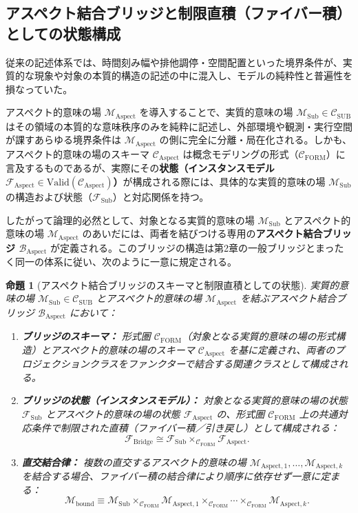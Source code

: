 \documentclass[11pt,a4paper]{ltjsarticle}
\theoremstyle{definition}
\theoremstyle{plain}
\newtheorem{proposition}{命題}[section]
\theoremstyle{remark}
\newcommand{\Valid}{\mathrm{Valid}}
\newcommand{\CFORM}{\mathcal{C}_{\mathrm{FORM}}}
\newcommand{\CSUB}{\mathcal{C}_{\mathrm{SUB}}}
\newcommand{\CAspect}{\mathcal{C}_{\mathrm{Aspect}}}
\newcommand{\MAspect}{\mathcal{M}_{\mathrm{Aspect}}}
\newcommand{\MSub}{\mathcal{M}_{\mathrm{Sub}}}
\newcommand{\BAspect}{\mathcal{B}_{\mathrm{Aspect}}}
\begin{document}
\subsection{アスペクト結合ブリッジと制限直積（ファイバー積）としての状態構成}
従来の記述体系では、時間刻み幅や排他調停・空間配置といった境界条件が、実質的な現象や対象の本質的構造の記述の中に混入し、モデルの純粋性と普遍性を損なっていた。

アスペクト的意味の場 $\MAspect$ を導入することで、実質的意味の場 $\MSub \in \CSUB$ はその領域の本質的な意味秩序のみを純粋に記述し、外部環境や観測・実行空間が課すあらゆる境界条件は $\MAspect$ の側に完全に分離・局在化される。しかも、アスペクト的意味の場のスキーマ $\CAspect$ は概念モデリングの形式（$\CFORM$）に言及するものであるが、実際にその\textbf{状態（インスタンスモデル $\mathcal{F}_{\mathrm{Aspect}} \in \Valid(\CAspect)$）}が構成される際には、具体的な実質的意味の場 $\MSub$ の構造および状態（$\mathcal{F}_{\mathrm{Sub}}$）と対応関係を持つ。

したがって論理的必然として、対象となる実質的意味の場 $\MSub$ とアスペクト的意味の場 $\MAspect$ のあいだには、両者を結びつける専用の\textbf{アスペクト結合ブリッジ $\BAspect$} が定義される。このブリッジの構造は第2章の一般ブリッジとまったく同一の体系に従い、次のように一意に規定される。

\begin{proposition}[アスペクト結合ブリッジのスキーマと制限直積としての状態]\label{prop:aspect-coupling}
実質的意味の場 $\MSub \in \CSUB$ とアスペクト的意味の場 $\MAspect$ を結ぶアスペクト結合ブリッジ $\BAspect$ において：
\begin{enumerate}
    \item \textbf{ブリッジのスキーマ：} 形式圏 $\CFORM$（対象となる実質的意味の場の形式構造）とアスペクト的意味の場のスキーマ $\CAspect$ を基に定義され、両者のプロジェクションクラスをファンクターで結合する関連クラスとして構成される。
    \item \textbf{ブリッジの状態（インスタンスモデル）：} 対象となる実質的意味の場の状態 $\mathcal{F}_{\mathrm{Sub}}$ とアスペクト的意味の場の状態 $\mathcal{F}_{\mathrm{Aspect}}$ の、形式圏 $\CFORM$ 上の共通対応条件で制限された直積（ファイバー積／引き戻し）として構成される：
    \begin{equation}
    \mathcal{F}_{\mathrm{Bridge}} \cong \mathcal{F}_{\mathrm{Sub}} \times_{\CFORM} \mathcal{F}_{\mathrm{Aspect}}.
    \end{equation}
    \item \textbf{直交結合律：} 複数の直交するアスペクト的意味の場 $\mathcal{M}_{\mathrm{Aspect}, 1}, \dots, \mathcal{M}_{\mathrm{Aspect}, k}$ を結合する場合、ファイバー積の結合律により順序に依存せず一意に定まる：
    \begin{equation}
    \mathcal{M}_{\mathrm{bound}} \equiv \MSub \times_{\CFORM} \mathcal{M}_{\mathrm{Aspect}, 1} \times_{\CFORM} \cdots \times_{\CFORM} \mathcal{M}_{\mathrm{Aspect}, k}.
    \end{equation}
\end{enumerate}
\end{proposition}
\end{document}
